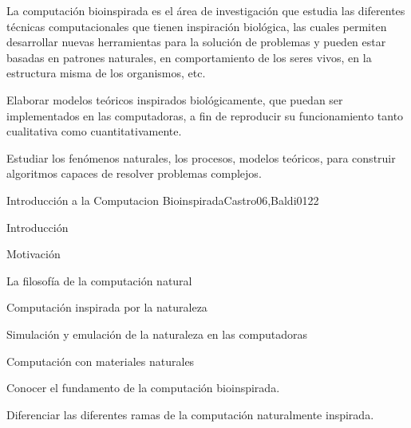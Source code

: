\begin{syllabus}


\begin{justification}
La computación bioinspirada es el área de investigación que estudia
las diferentes técnicas computacionales que tienen inspiración
biológica, las cuales permiten desarrollar nuevas herramientas para
la solución de problemas y pueden estar basadas en patrones
naturales, en comportamiento de los seres vivos, en la estructura
misma de los organismos, etc. 
\end{justification}

\begin{goals}
\item Elaborar modelos teóricos inspirados biológicamente, que puedan ser implementados en las computadoras, a fin de reproducir su funcionamiento tanto cualitativa como cuantitativamente.
\item Estudiar los fenómenos naturales, los procesos, modelos teóricos, para construir algoritmos capaces de resolver problemas complejos.
\end{goals}

\begin{outcomes}
\end{outcomes}

\begin{unit}{Introducción a la Computacion Bioinspirada}{Castro06,Baldi01}{2}{2}
\begin{topics}
        \item Introducción
        \item Motivación
        \item La filosofía de la computación natural
        \item Computación inspirada por la naturaleza
        \item Simulación y emulación de la naturaleza en las computadoras
        \item Computación con materiales naturales
    \end{topics}
    \begin{unitgoals}
        \item Conocer el fundamento de la computación bioinspirada.
        \item Diferenciar las diferentes ramas de la computación naturalmente inspirada.
    \end{unitgoals}
\end{unit}


\end{syllabus}
